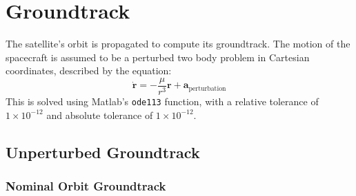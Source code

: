 \documentclass{article}
\begin{document}
\section{Groundtrack}
The satellite's orbit is propagated to compute its groundtrack. The motion of the spacecraft is assumed to be a perturbed two body problem in Cartesian coordinates, described by the equation:
\[
\dot{\mathbf{r}} = -\frac{\mu}{r^3} \mathbf{r} + \mathbf{a}_{\text{perturbation}}
\]
This is solved using Matlab's \texttt{ode113} function, with a relative tolerance of \(1 \times 10^{-12}\) and absolute tolerance of \(1 \times 10^{-12}\).


\subsection{Unperturbed Groundtrack}
\subsubsection{Nominal Orbit Groundtrack}
\end{document}
